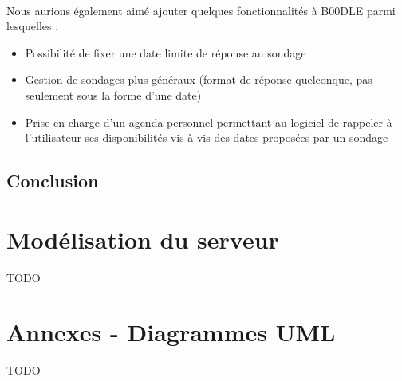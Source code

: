 \documentclass[titlepage]{report}
\begin{document}
\paragraph{} Nous aurions également aimé ajouter quelques fonctionnalités à B00DLE parmi lesquelles : \begin{itemize}
	\item Possibilité de fixer une date limite de réponse au sondage
	\item Gestion de sondages plus généraux (format de réponse quelconque, pas seulement sous la forme d'une date)
	\item Prise en charge d'un agenda personnel permettant au logiciel de rappeler à l'utilisateur ses disponibilités vis à vis des dates proposées par un sondage
\end{itemize}

\chapter{Conclusion}

\clearpage
\part{Modélisation du serveur}
\label{part_modelServer}

\par TODO

\part{Annexes - Diagrammes UML}
\label{part_allUML}

\par TODO
\end{document}

